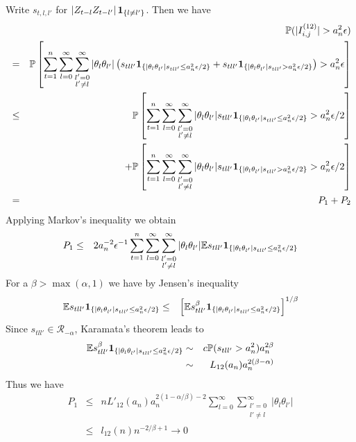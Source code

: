 \documentclass{article}
\begin{document}
Write $s_{t,l,l'}$ for $\left|Z_{t-l} Z_{t-l'}\right|\mathbf{1}_{\{l\neq
  l'\}}$. Then we have
\begin{eqnarray*}
  && \mathbb{P}(|I^{(12)}_{i,j}| > a_n^2 \epsilon) \\
  &=& \mathbb{P}\left[
    \sum_{t=1}^n \sum_{l=0}^\infty \sum_{\substack{l'=0 \\l'\neq
        l}}^\infty |\theta_l \theta_{l'}| \left(s_{tll'} \mathbf{1}_{\{|\theta_l \theta_{l'}|s_{tll'} \leq a_n^2
        \epsilon/2\}} + s_{tll'} \mathbf{1}_{\{|\theta_l \theta_{l'}|s_{tll'} > a_n^2
        \epsilon/2\}}\right) > a_n^2 \epsilon\right] \\
  &\leq& \mathbb{P}\left[
    \sum_{t=1}^n \sum_{l=0}^\infty \sum_{\substack{l'=0 \\l'\neq
        l}}^\infty |\theta_l \theta_{l'}|s_{tll'} \mathbf{1}_{\{|\theta_l \theta_{l'}|s_{tll'} \leq a_n^2 \epsilon/2\}} >
    a_n^2 \epsilon/2\right] \\
  && + \mathbb{P}\left[
    \sum_{t=1}^n \sum_{l=0}^\infty \sum_{\substack{l'=0 \\l'\neq
        l}}^\infty |\theta_l \theta_{l'}|s_{tll'} \mathbf{1}_{\{|\theta_l \theta_{l'}|s_{tll'} > a_n^2 \epsilon/2\}} >
    a_n^2 \epsilon/2\right] \\
  &=& P_1 + P_2
\end{eqnarray*}
Applying Markov's inequality we obtain
\begin{eqnarray*}
  P_1 &\leq& 2 a_n^{-2} \epsilon^{-1}
    \sum_{t=1}^n \sum_{l=0}^\infty \sum_{\substack{l'=0 \\l'\neq
        l}}^\infty |\theta_l \theta_{l'}| \mathbb{E} s_{tll'} \mathbf{1}_{\{|\theta_l
      \theta_{l'}|s_{tll'} \leq a_n^2 \epsilon/2\}}
\end{eqnarray*}
For a $\beta > \max(\alpha, 1)$ we have by Jensen's inequality
\begin{eqnarray*}
  \mathbb{E} s_{tll'} \mathbf{1}_{\{|\theta_l \theta_{l'}|s_{tll'} \leq a_n^2 \epsilon/2\}} &\leq&
  \left[
    \mathbb{E} s_{tll'}^{\beta} \mathbf{1}_{\{|\theta_l \theta_{l'}|s_{tll'} \leq a_n^2 \epsilon/2\}}
  \right]^{1/\beta}
\end{eqnarray*}
Since $s_{tll'} \in \mathcal R_{-\alpha}$, Karamata's theorem leads
to
\begin{eqnarray*}
  \mathbb{E} s_{tll'}^{\beta} \mathbf{1}_{\{|\theta_l \theta_{l'}|s_{tll'} \leq a_n^2 \epsilon/2\}} &\sim&
  c \mathbb{P}(s_{tll'} > a_n^2) a_n^{2\beta} \\
  &\sim& L_{12}(a_n) a_n^{2(\beta - \alpha)}
\end{eqnarray*}
Thus we have
\begin{eqnarray*}
  P_1 &\leq& n L'_{12}(a_n) a_n^{2(1 - \alpha/\beta)-2}
  \sum_{l=0}^\infty \sum_{\substack{l'=0 \\l'\neq l}}^\infty |\theta_l
  \theta_{l'}| \\
  &\leq& l_{12}(n) n^{-2/\beta + 1} \to 0
\end{eqnarray*}
\end{document}
